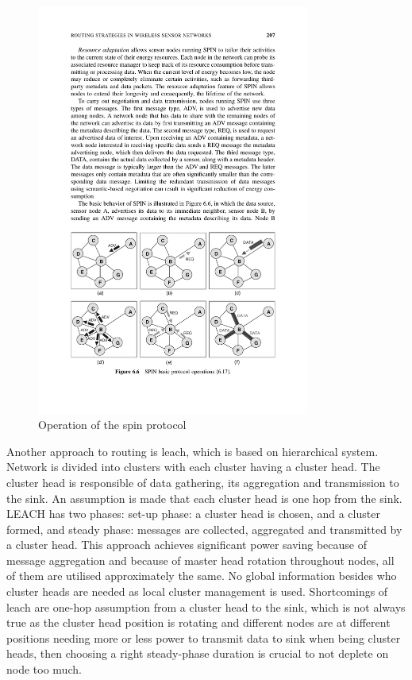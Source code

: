 \begin{figure}[ht]
    \centering
    \includegraphics[width=0.8\textwidth]{00images/spin-protocol}
    \caption{Operation of the \acrshort{spin} protocol}
    \label{fig:spin-protocol}
\end{figure}

Another approach to routing is \acrfull{leach}, which is based on hierarchical system. Network is divided into clusters with each cluster having a cluster head. The cluster head is responsible of data gathering, its aggregation and transmission to the sink. An assumption is made that each cluster head is one hop from the sink. LEACH has two phases: set-up phase: a cluster head is chosen, and a cluster formed, and steady phase: messages are collected, aggregated and transmitted by a cluster head. This approach achieves significant power saving because of message aggregation and because of master head rotation throughout nodes, all of them are utilised approximately the same. No global information besides who cluster heads are needed as local cluster management is used. Shortcomings of \acrshort{leach} are one-hop assumption from a cluster head to the sink, which is not always true as the cluster head position is rotating and different nodes are at different positions needing more or less power to transmit data to sink when being cluster heads, then choosing a right steady-phase duration is crucial to not deplete on node too much.

